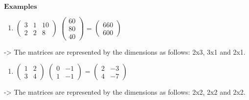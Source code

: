 \documentclass[]{article}
\providecommand{\tightlist}{%
  \setlength{\itemsep}{0pt}\setlength{\parskip}{0pt}}
\begin{document}
~

\newpage

\(\mathbf{Examples}\)\\

\begin{enumerate}
\def\labelenumi{\alph{enumi})}
\tightlist
\item
  \(\begin{pmatrix} 3 & 1 & 10 \\ 2 & 2 & 8 \end{pmatrix}\)
  \(\begin{pmatrix} 60 \\ 80 \\ 40 \end{pmatrix}\) =
  \(\begin{pmatrix} 660 \\ 600 \end{pmatrix}\)\\
\end{enumerate}

-\textgreater{} The matrices are represented by the dimensions as
follows: 2x3, 3x1 and 2x1.\\

\begin{enumerate}
\def\labelenumi{\alph{enumi})}
\setcounter{enumi}{1}
\tightlist
\item
  \(\begin{pmatrix} 1 & 2 \\ 3 & 4 \end{pmatrix}\)
  \(\begin{pmatrix} 0 & -1 \\ 1 & -1 \end{pmatrix}\) =
  \(\begin{pmatrix} 2 & -3 \\ 4 & -7 \end{pmatrix}\)\\
\end{enumerate}

-\textgreater{} The matrices are represented by the dimensions as
follows: 2x2, 2x2 and 2x2.\\
\end{document}
